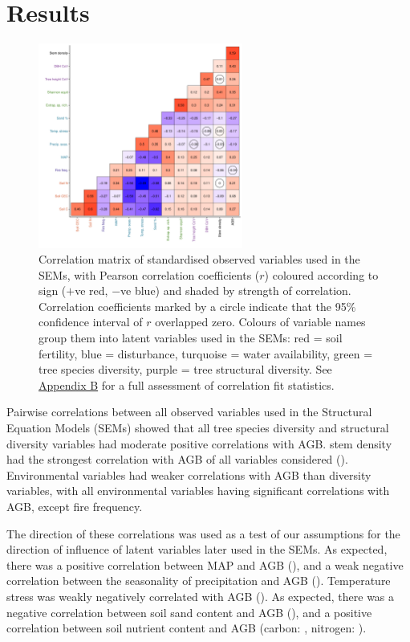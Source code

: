 \documentclass[11pt,a4paper]{article}
\begin{document}
\section{Results}

\begin{figure}[H]
\centering
	\includegraphics[width=0.6\textwidth]{corr_mat}
	\caption{Correlation matrix of standardised observed variables used in the SEMs, with Pearson correlation coefficients ($r$) coloured according to sign ($+$ve red, $-$ve blue) and shaded by strength of correlation. Correlation coefficients marked by a circle indicate that the 95\% confidence interval of $r$ overlapped zero. Colours of variable names group them into latent variables used in the SEMs: red = soil fertility, blue = disturbance, turquoise = water availability, green = tree species diversity, purple = tree structural diversity. See \hyperref[appendixb]{Appendix B} for a full assessment of correlation fit statistics.}
	\label{corr_mat}
\end{figure}

Pairwise correlations between all observed variables used in the Structural Equation Models (SEMs) showed that all tree species diversity and structural diversity variables had moderate positive correlations with AGB. stem density had the strongest correlation with AGB of all variables considered (\ccib{}). Environmental variables had weaker correlations with AGB than diversity variables, with all environmental variables having significant correlations with AGB, except fire frequency.

The direction of these correlations was used as a test of our assumptions for the direction of influence of latent variables later used in the SEMs. As expected, there was a positive correlation between MAP and AGB (\ccmb{}), and a weak negative correlation between the seasonality of precipitation and AGB (\ccmcb{}). Temperature stress was weakly negatively correlated  with AGB (\cctcb{}). As expected, there was a negative correlation between soil sand content and AGB (\ccsb{}), and a positive correlation between soil nutrient content and AGB (carbon: \ccob{}, nitrogen: \ccnb{}). 
\end{document}
